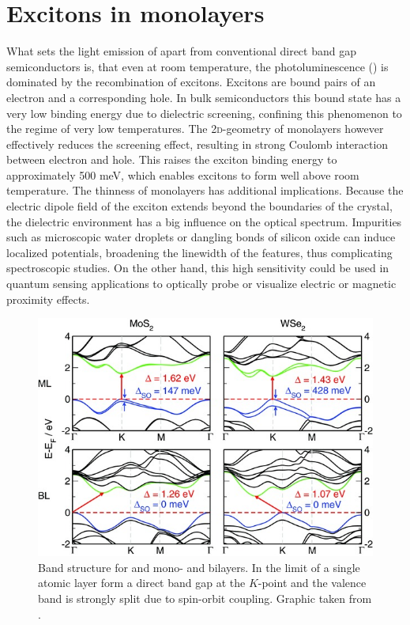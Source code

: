 \section{Excitons in \tmdg monolayers}\label{theory_exciton}

What sets the light emission of \tmds apart from conventional direct band gap semiconductors is, that even at room temperature, the photoluminescence (\pl\!) is dominated by the recombination of excitons. Excitons are bound pairs of an electron and a corresponding hole. In bulk semiconductors this bound state has a very low binding energy due to dielectric screening, confining this phenomenon to the regime of very low temperatures. The 2\textsc{d}-geometry of \tmdg monolayers however effectively reduces the screening effect, resulting in strong Coulomb interaction between electron and hole. This raises the exciton binding energy to approximately 500 meV, which enables excitons to form well above room temperature\cite{chernikov_exciton_2014}.
The thinness of \tmdg monolayers has additional implications. Because the electric dipole field of the exciton extends beyond the boundaries of the crystal, the dielectric environment has a big influence on the optical spectrum\cite{stier_probing_2016, borghardt_engineering_2017, jakubczyk_impact_2018}. Impurities such as microscopic water droplets or dangling bonds of silicon oxide can induce localized potentials, broadening the linewidth of the \pl features, thus complicating spectroscopic studies. On the other hand, this high sensitivity could be used in quantum sensing applications to optically probe or visualize electric or magnetic proximity effects\cite{peng_valley_2017, zhao_enhanced_2017, smolenski_tuning_2016, neumann_opto-valleytronic_2017}.


\begin{figure}[t]
\centering
\includegraphics[width=.7\textwidth]{bandstructure}
\caption{Band structure for \mos and \wse mono- and bilayers. In the limit of a single atomic layer \tmds form a direct band gap at the $K$-point and the valence band is strongly split due to spin-orbit coupling. Graphic taken from \cite{zibouche_transition-metal_2014_2}.}
\label{bandgap}

\end{figure}

